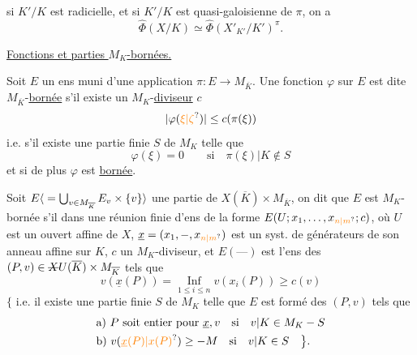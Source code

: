 si $K'/K$ est radicielle, et   si $K'/K$ est quasi-galoisienne de  $\pi$, on a
\[
\widehat{\Phi}(X/K)\simeq\widehat{\Phi}(X'_{K'}/K')^{\pi}.
\]

\uline{Fonctions et parties $M_K$-bornées.}


Soit $E$ un ens muni d'une application $\pi:E\longrightarrow M_{\overline K}$. Une fonction $\varphi$ sur $E$ est dite $M_{\overline K}$-\uline{bornée}  s'il existe un $M_K$-\uline{diviseur} $c$  
\[
|\varphi(\unsure{\xi|\zeta})|\leq c(\pi(\xi))
\]
i.e. s'il existe une partie finie $S$ de $M_K$  telle que
\[
\varphi(\xi)=0\qquad\text{si}\quad \pi(\xi)|K\notin S
\]
et si de plus $\varphi$ est \uline{bornée}. 

Soit $E\inserted{{}=\bigcup_{v\in M_{\overline K}} E_v\times\{v\}}$ une partie de $X(\overline K)\times M_{\overline K}$, on dit que $E$ est $M_K$-bornée s'il   dans une réunion finie d'ens de la forme $E(U;x_1,\ldots,x_{\unsure{n|m}};c)$, où $U$ est un ouvert
affine de $X$, $\underline{x}=(x_1,-,x_{\unsure{n|m}})$ est un syst. de générateurs de son anneau affine sur $K$, $c$ un $M_K$-diviseur, et $E(\text{---})$ est l'ens des $(P,v)\in\deleted{X}U(\overline K)\times M_{\overline K}$ tels que
\[
v(\underline{x}(P))=\mathop{\mathrm{Inf}}\limits_{1\leq i\leq n} v(x_i(P))\geq c(v)
\]
$\bigl\{$ i.e.  il existe une partie finie $S$ de $M_K$ telle que $E$ est formé des $(P,v)$  tels que
\[
\begin{aligned}
&\text{a) }P\text{ soit entier pour }\underline{x},v\quad\text{si}\quad v|K\in M_K-S\\
&\text{b) }v(\unsure{\underline{x}(P)|x(P)})\geq-M\quad\text{si}\quad v|K\in S\quad\bigl\}.
\end{aligned}
\]


